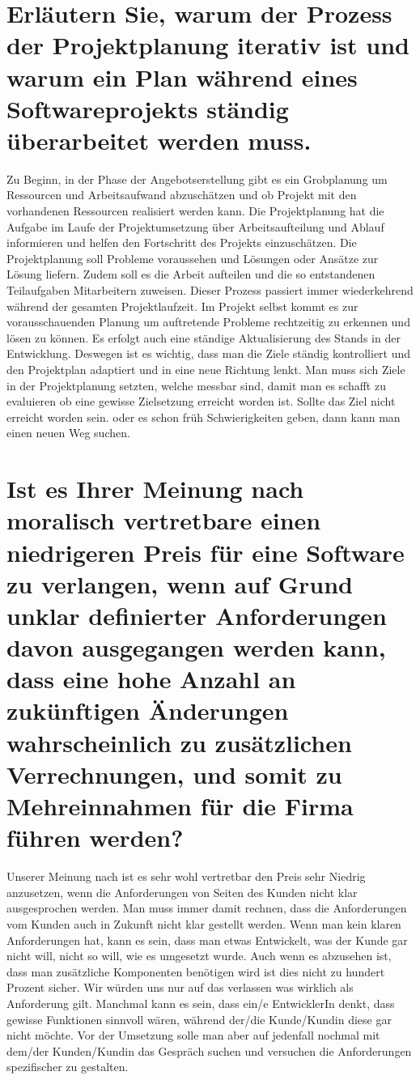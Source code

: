\documentclass[12pt]{article}
\begin{document}
\section{Erläutern Sie, warum der Prozess der Projektplanung iterativ ist und warum ein Plan während eines Softwareprojekts ständig überarbeitet werden muss.}

Zu Beginn, in der Phase der Angebotserstellung gibt es ein Grobplanung um Ressourcen und Arbeitsaufwand abzuschätzen und ob Projekt mit den vorhandenen Ressourcen realisiert werden kann.
Die Projektplanung hat die Aufgabe im Laufe der Projektumsetzung über Arbeitsaufteilung und Ablauf informieren und helfen den Fortschritt des Projekts einzuschätzen. Die Projektplanung soll Probleme voraussehen und Lösungen oder Ansätze zur Lösung liefern. Zudem soll es die Arbeit aufteilen und die so entstandenen Teilaufgaben Mitarbeitern zuweisen. Dieser Prozess passiert immer wiederkehrend während der gesamten Projektlaufzeit.
Im Projekt selbst kommt es zur vorausschauenden Planung um auftretende Probleme rechtzeitig zu erkennen und lösen zu können. Es erfolgt auch eine ständige Aktualisierung des Stands in der Entwicklung. Deswegen ist es wichtig, dass man die Ziele ständig kontrolliert und den Projektplan adaptiert und in eine neue Richtung lenkt. Man muss sich Ziele in der Projektplanung setzten, welche messbar sind, damit man es schafft zu evaluieren ob eine gewisse Zielsetzung erreicht worden ist. Sollte das Ziel nicht erreicht worden sein. oder es schon früh Schwierigkeiten geben, dann kann man einen neuen Weg suchen.
\section{Ist es Ihrer Meinung nach moralisch vertretbare einen niedrigeren Preis für eine Software zu verlangen,
wenn auf Grund unklar definierter Anforderungen davon ausgegangen werden kann, dass eine hohe Anzahl an zukünftigen Änderungen wahrscheinlich zu zusätzlichen Verrechnungen, und somit zu Mehreinnahmen für die Firma führen werden?}
Unserer Meinung nach ist es sehr wohl vertretbar den Preis sehr Niedrig anzusetzen, wenn die Anforderungen von Seiten des Kunden nicht klar ausgesprochen werden. Man muss immer damit rechnen, dass die Anforderungen vom Kunden auch in Zukunft nicht klar gestellt werden. Wenn man kein klaren Anforderungen hat, kann es sein, dass man etwas Entwickelt, was der Kunde gar nicht will, nicht so will, wie es umgesetzt wurde. Auch wenn es abzusehen ist, dass man zusätzliche Komponenten benötigen wird ist dies nicht zu hundert Prozent sicher. Wir würden uns nur auf das verlassen was wirklich als Anforderung gilt. Manchmal kann es sein, dass ein/e EntwicklerIn denkt, dass gewisse Funktionen sinnvoll wären, während der/die Kunde/Kundin diese gar nicht möchte.
Vor der Umsetzung solle man aber auf jedenfall nochmal mit dem/der Kunden/Kundin das Gespräch suchen und versuchen die Anforderungen spezifischer zu gestalten.
\end{document}
